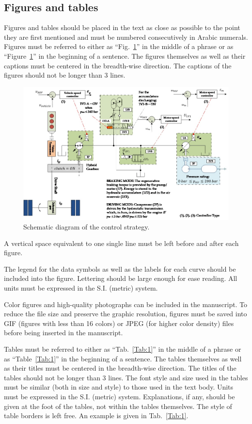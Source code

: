 \documentclass[10pt,fleqn,a4paper,twoside]{article}
\begin{document}
\subsection{Figures and tables}

Figures and tables should be placed in the text as close as possible to the point they are first mentioned and must be numbered consecutively in Arabic numerals. Figures must be referred to either as ``Fig.~\ref{Fig:1}'' in the middle of a phrase or as ``Figure~\ref{Fig:1}'' in the beginning of a sentence. The figures themselves as well as their captions must be centered in the breadth-wise direction. The captions of the figures should not be longer than 3 lines.

\begin{figure}[h!]
\centering
\includegraphics[angle=0, width=17cm]{figure.jpg}
\caption{Schematic diagram of the control strategy.}
\label{Fig:1}
\end{figure}

A vertical space equivalent to one single line must be left before and after each figure.

The legend for the data symbols as well as the labels for each curve should be included into the figure. Lettering should be large enough for ease reading. All units must be expressed in the S.I. (metric) system.

Color figures and high-quality photographs can be included in the manuscript. To reduce the file size and preserve the graphic resolution, figures must be saved into GIF (figures with less than 16 colors) or JPEG (for higher color density) files before being inserted in the manuscript.

Tables must be referred to either as ``Tab.~\ref{Tab:1}'' in the middle of a phrase or as ``Table~\ref{Tab:1}'' in the beginning of a sentence.  The tables themselves as well as their titles must be centered in the breadth-wise direction. The titles of the tables should not be longer than 3 lines. The font style and size used in the tables must be similar (both in size and style) to those used in the text body. Units must be expressed in the S.I. (metric) system. Explanations, if any, should be given at the foot of the tables, not within the tables themselves. The style of table borders is left free. An example is given in Tab.~\ref{Tab:1}.
\end{document}
